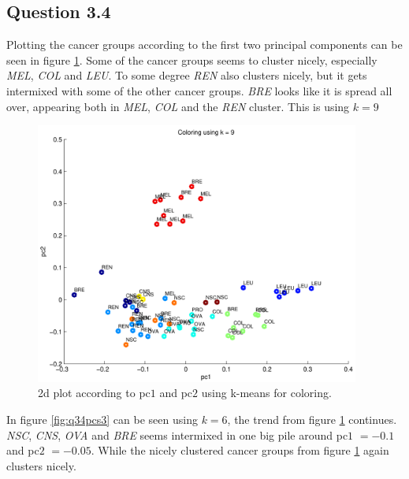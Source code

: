 \subsection*{Question 3.4}

Plotting the cancer groups according to the first two principal
components can be seen in figure \ref{fig:q34pcs2}. Some of the cancer
groups seems to cluster nicely, especially \emph{MEL}, \emph{COL} and
\emph{LEU}. To some degree \emph{REN} also clusters nicely, but it
gets intermixed with some of the other cancer groups. \emph{BRE} looks
like it is spread all over, appearing both in \emph{MEL}, \emph{COL}
and the \emph{REN} cluster. This is using $k = 9$

\begin{figure}[!htbp]
  \centering \includegraphics[width=0.95\textwidth]{./images/q34pcs2}
  \caption{2d plot according to pc$1$ and pc$2$ using k-means for
    coloring.}
  \label{fig:q34pcs2}
\end{figure}

\newpage

In figure \ref{fig:q34pcs3} can be seen using $k = 6$, the trend from
figure \ref{fig:q34pcs2} continues. \emph{NSC}, \emph{CNS}, \emph{OVA}
and \emph{BRE} seems intermixed in one big pile around pc$1$ $= -0.1$
and pc$2$ $= -0.05$. While the nicely clustered cancer groups from
figure \ref{fig:q34pcs2} again clusters nicely.

